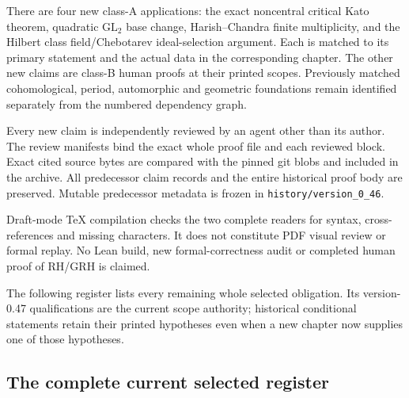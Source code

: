 There are four new class-A applications: the exact noncentral critical
Kato theorem, quadratic \(\mathrm{GL}_2\) base change,
Harish--Chandra finite multiplicity, and the Hilbert class
field/Chebotarev ideal-selection argument. Each is matched to its
primary statement and the actual data in the corresponding chapter.
The other new claims are class-B human proofs at their printed scopes.
Previously matched cohomological, period, automorphic and geometric
foundations remain identified separately from the numbered dependency
graph.

Every new claim is independently reviewed by an agent other than its
author. The review manifests bind the exact whole proof file and each
reviewed block. Exact cited source bytes are compared with the pinned
git blobs and included in the archive. All predecessor claim records
and the entire historical proof body are preserved. Mutable predecessor
metadata is frozen in \texttt{history/version\_0\_46}.

Draft-mode TeX compilation checks the two complete readers for syntax,
cross-references and missing characters. It does not constitute PDF
visual review or formal replay. No Lean build, new formal-correctness
audit or completed human proof of RH/GRH is claimed.

The following register lists every remaining whole selected obligation.
Its version-0.47 qualifications are the current scope authority;
historical conditional statements retain their printed hypotheses even
when a new chapter now supplies one of those hypotheses.

\subsection{The complete current selected register}

